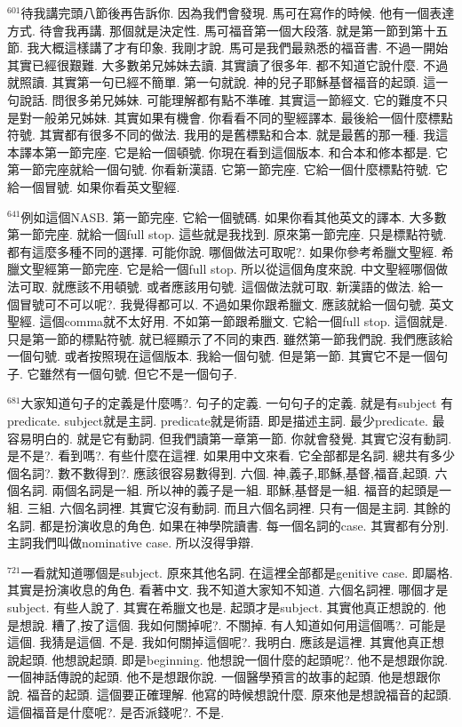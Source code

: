 \documentclass{book}
\begin{document}
$^{601}$待我講完頭八節後再告訴你.
因為我們會發現.
馬可在寫作的時候.
他有一個表達方式.
待會我再講.
那個就是決定性.
馬可福音第一個大段落.
就是第一節到第十五節.
我大概這樣講了才有印象.
我剛才說.
馬可是我們最熟悉的福音書.
不過一開始其實已經很艱難.
大多數弟兄姊妹去讀.
其實讀了很多年.
都不知道它說什麼.
不過就照讀.
其實第一句已經不簡單.
第一句就說.
神的兒子耶穌基督福音的起頭.
這一句說話.
問很多弟兄姊妹.
可能理解都有點不準確.
其實這一節經文.
它的難度不只是對一般弟兄姊妹.
其實如果有機會.
你看看不同的聖經譯本.
最後給一個什麼標點符號.
其實都有很多不同的做法.
我用的是舊標點和合本.
就是最舊的那一種.
我這本譯本第一節完座.
它是給一個頓號.
你現在看到這個版本.
和合本和修本都是.
它第一節完座就給一個句號.
你看新漢語.
它第一節完座.
它給一個什麼標點符號.
它給一個冒號.
如果你看英文聖經.

$^{641}$例如這個NASB.
第一節完座.
它給一個號碼.
如果你看其他英文的譯本.
大多數第一節完座.
就給一個full stop.
這些就是我找到.
原來第一節完座.
只是標點符號.
都有這麼多種不同的選擇.
可能你說.
哪個做法可取呢?.
如果你參考希臘文聖經.
希臘文聖經第一節完座.
它是給一個full stop.
所以從這個角度來說.
中文聖經哪個做法可取.
就應該不用頓號.
或者應該用句號.
這個做法就可取.
新漢語的做法.
給一個冒號可不可以呢?.
我覺得都可以.
不過如果你跟希臘文.
應該就給一個句號.
英文聖經.
這個comma就不太好用.
不如第一節跟希臘文.
它給一個full stop.
這個就是.
只是第一節的標點符號.
就已經顯示了不同的東西.
雖然第一節我們說.
我們應該給一個句號.
或者按照現在這個版本.
我給一個句號.
但是第一節.
其實它不是一個句子.
它雖然有一個句號.
但它不是一個句子.

$^{681}$大家知道句子的定義是什麼嗎?.
句子的定義.
一句句子的定義.
就是有subject 有predicate.
subject就是主詞.
predicate就是術語.
即是描述主詞.
最少predicate.
最容易明白的.
就是它有動詞.
但我們讀第一章第一節.
你就會發覺.
其實它沒有動詞.
是不是?.
看到嗎?.
有些什麼在這裡.
如果用中文來看.
它全部都是名詞.
總共有多少個名詞?.
數不數得到?.
應該很容易數得到.
六個.
神,義子,耶穌,基督,福音,起頭.
六個名詞.
兩個名詞是一組.
所以神的義子是一組.
耶穌,基督是一組.
福音的起頭是一組.
三組.
六個名詞裡.
其實它沒有動詞.
而且六個名詞裡.
只有一個是主詞.
其餘的名詞.
都是扮演收息的角色.
如果在神學院讀書.
每一個名詞的case.
其實都有分別.
主詞我們叫做nominative case.
所以沒得爭辯.

$^{721}$一看就知道哪個是subject.
原來其他名詞.
在這裡全部都是genitive case.
即屬格.
其實是扮演收息的角色.
看著中文.
我不知道大家知不知道.
六個名詞裡.
哪個才是subject.
有些人說了.
其實在希臘文也是.
起頭才是subject.
其實他真正想說的.
他是想說.
糟了,按了這個.
我如何關掉呢?.
不關掉.
有人知道如何用這個嗎?.
可能是這個.
我猜是這個.
不是.
我如何關掉這個呢?.
我明白.
應該是這裡.
其實他真正想說起頭.
他想說起頭.
即是beginning.
他想說一個什麼的起頭呢?.
他不是想跟你說.
一個神話傳說的起頭.
他不是想跟你說.
一個醫學預言的故事的起頭.
他是想跟你說.
福音的起頭.
這個要正確理解.
他寫的時候想說什麼.
原來他是想說福音的起頭.
這個福音是什麼呢?.
是否派錢呢?.
不是.
\end{document}
